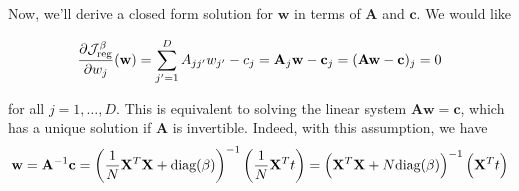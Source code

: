 \documentclass{article}
\begin{document}
\begin{enumerate}[(a)]
        Now, we'll derive a closed form solution for $\mathbf{w}$ in terms of $\mathbf{A}$ and $\mathbf{c}$. We would like 

        \[\frac{\partial \mathcal{J}^{\beta}_{\text{reg}}}{\partial w_j} (\mathbf{w}) = \sum_{j' = 1}^D A_{jj'} w_{j'} - c_j = \mathbf{A}_j \mathbf{w} - \mathbf{c}_j = (\mathbf{Aw} - \mathbf{c})_j = 0\]

        for all $j = 1, \dots, D$. This is equivalent to solving the linear system $\mathbf{Aw} = \mathbf{c}$, which has a unique solution if $\mathbf{A}$ is invertible. Indeed, with this assumption, we have \[\mathbf{w} = \mathbf{A}^{-1} \mathbf{c} = \left(\frac{1}{N} \mathbf{X}^T \mathbf{X} + \text{diag}(\beta)\right)^{-1}\left(\frac{1}{N} \mathbf{X}^T t\right) = \left(\mathbf{X}^T \mathbf{X} + N \text{diag}(\beta)\right)^{-1}\left(\mathbf{X}^T t\right)\] 
\end{enumerate}
\end{document}
